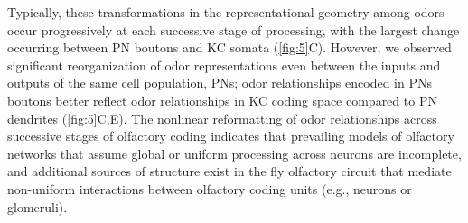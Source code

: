 \documentclass[12pt]{caltech_thesis}
\begin{document}
\begin{refsection}
Typically, these transformations in the representational geometry among odors occur progressively at each successive stage of processing, with the largest change occurring between PN boutons and KC somata (\cref{fig:5}C).
However, we observed significant reorganization of odor representations even between the inputs and outputs of the same cell population, PNs; odor relationships encoded in PNs boutons better reflect odor relationships in KC coding space compared to PN dendrites (\cref{fig:5}C,E).
The nonlinear reformatting of odor relationships across successive stages of olfactory coding indicates that prevailing models of olfactory networks that assume global or uniform processing across neurons are incomplete, and additional sources of structure exist in the fly olfactory circuit that mediate non-uniform interactions between olfactory coding units (e.g., neurons or glomeruli).
\fi


\end{refsection}
\end{document}
